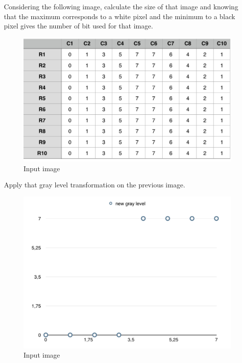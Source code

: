 \documentclass[12pt]{tdtp}
\begin{document}
\titre

\Exo

Considering the following image, calculate the size of that image and knowing that the maximum corresponds to a white pixel and the minimum to a black pixel gives the number of bit used for that image.



\begin{figure}[h!]
	\begin{center}
		\includegraphics[scale=0.5]{images/I1.png}
		\caption{Input image}
	\end{center}
\end{figure}

\newpage 
\Exo

Apply that gray level transformation on the previous image.

\begin{figure}[h!]
	\begin{center}
		\includegraphics[scale=0.5]{images/I2.png}
		\caption{Input image}
	\end{center}
\end{figure}
\end{document}
